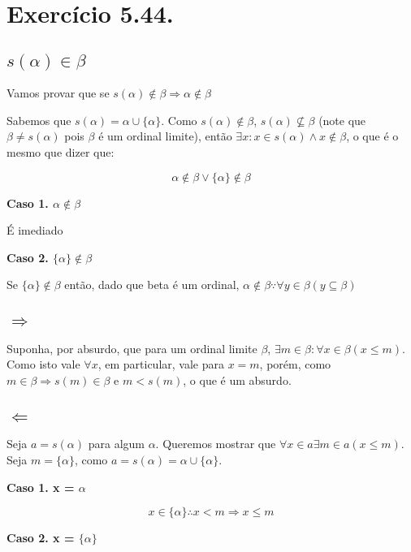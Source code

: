 \documentclass[12pt]{extarticle}
\begin{document}
\section{Exercício 5.44.}

\subsection{$s(\alpha) \in \beta$}

Vamos provar que se $s(\alpha) \notin \beta \Rightarrow \alpha \notin \beta$

Sabemos que $s(\alpha) = \alpha \cup \{\alpha\}$. Como $s(\alpha) \notin \beta$, $s(\alpha) \nsubseteq \beta$ (note que $\beta \neq s(\alpha)$ pois $\beta$ é um ordinal limite), então $\exists x : x \in s(\alpha) \land x \notin \beta$, o que é o mesmo que dizer que:

$$
\alpha \notin \beta \lor \{\alpha\} \notin \beta
$$


\textbf{Caso 1. $\alpha \notin \beta$}

É imediado

\textbf{Caso 2. $\{\alpha\} \notin \beta$}

Se $\{\alpha\} \notin \beta$ então, dado que beta é um ordinal, $\alpha \notin \beta \because \forall y \in \beta (y \subseteq \beta)$ 


\subsection{$\Rightarrow$}

Suponha, por absurdo, que para um ordinal limite $\beta$, $\exists m \in \beta : \forall x \in \beta (x \leq m)$. Como isto vale $\forall x$, em particular, vale para $x = m$, porém, como $m \in \beta \Rightarrow s(m) \in \beta$ e $m < s(m)$, o que é um absurdo. 

\subsection{$\Leftarrow$}

Seja $a = s(\alpha)$ para algum $\alpha$. Queremos mostrar que $\forall x \in a \exists m \in a (x \leq m)$. Seja $m = \{\alpha\}$, como $a = s(\alpha) = \alpha \cup \{\alpha\}$. 

\textbf{Caso 1. x = $\alpha$}

$$x \in \{\alpha\} \therefore x < m \Rightarrow x \leq m$$

\textbf{Caso 2. x = $\{\alpha\}$}
\end{document}
